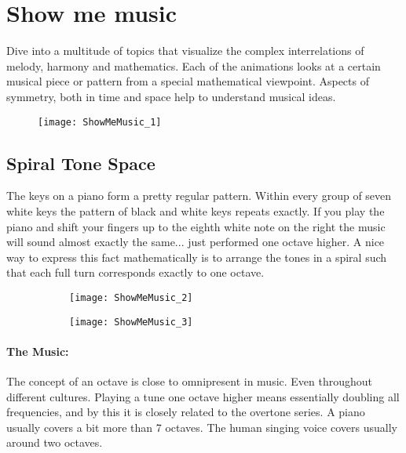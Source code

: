 \section{Show me music}
Dive into a multitude of topics that visualize the complex interrelations of melody, harmony and mathematics. Each of the animations looks at a certain musical piece or pattern from a special mathematical viewpoint. Aspects of symmetry, both in time and space help to understand musical ideas.

\begin{figure}[!h]
\centering
\texttt{[image: ShowMeMusic\_1]}
\end{figure}

\subsection{Spiral Tone Space}
The keys on a piano form a pretty regular pattern. Within every group of seven white keys the pattern of black and white keys repeats exactly. If you play the piano and shift your fingers up to the eighth white note on the right the music will sound almost exactly the same... just performed one octave higher. A nice way to express this fact mathematically is to arrange the tones in a spiral such that each full turn corresponds exactly to one octave.

\begin{figure}[h]
\centering
\begin{subfigure}{0.45\textwidth}
\centering
\texttt{[image: ShowMeMusic\_2]}
\end{subfigure}
\begin{subfigure}{0.45\textwidth}
\centering
\texttt{[image: ShowMeMusic\_3]}
\end{subfigure}
\end{figure}


\paragraph{The Music:} The concept of an octave is close to omnipresent in music. Even throughout different cultures. Playing a tune one octave higher means essentially doubling all frequencies, and by this it is closely related to the overtone series. A piano usually covers a bit more than 7 octaves. The human singing voice covers usually around two octaves. 

